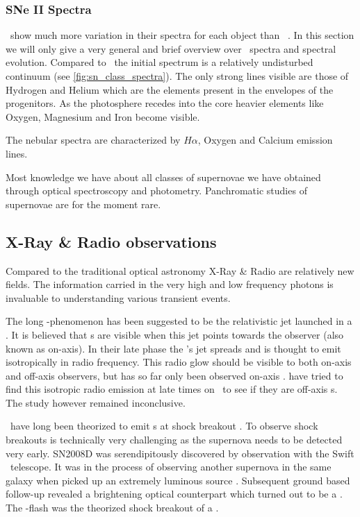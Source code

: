 \subsubsection{SNe II Spectra}
\sneii\ show much more variation in their spectra for each object than \sneia\ . In this section we will only give a very general and brief overview over \sneii\ spectra and spectral evolution. 
Compared to \sneia\ the initial spectrum is a relatively undisturbed continuum (see \ref{fig:sn_class_spectra}). The only strong lines visible are those of Hydrogen and Helium which are the elements present in the envelopes of the progenitors. 
As the photosphere recedes into the core heavier elements like Oxygen, Magnesium and Iron become visible. 

The nebular spectra are characterized by $H\alpha$, Oxygen and Calcium emission lines. 

Most knowledge we have about all classes of supernovae we have obtained through optical spectroscopy and photometry. Panchromatic studies of supernovae are for the moment rare.

\subsection{X-Ray \& Radio observations}

Compared to the traditional optical astronomy X-Ray \& Radio are relatively new fields. The information carried in the very high and low frequency photons is invaluable to understanding various transient events. 

The long \grb-phenomenon has been suggested to be the relativistic jet launched in a \snibc. It is believed that \grb s are visible when this jet points towards the observer (also known as on-axis). In their late phase the \grb 's jet spreads and is thought to emit isotropically in radio frequency. This radio glow should be visible to both on-axis and off-axis observers, but has so far only been observed on-axis . \cite{2006ApJ...638..930S} have tried to find this isotropic radio emission at late times on \snibc\ to see if they are off-axis \grb s. The study however remained inconclusive.

\sneii\ have long been theorized to emit \xray s at shock breakout \citep{1978ApJ...223L.109K,1974ApJ...187..333C}. To observe shock breakouts is technically very challenging as the supernova needs to be detected very early. SN2008D was serendipitously discovered by observation with the Swift \xray\ telescope. It was in the process of observing another supernova  in the same galaxy when  picked up an extremely luminous source \cite{2008Natur.453..469S}. Subsequent ground based follow-up revealed a brightening optical counterpart which turned out to be a \snibc. The \xray-flash was the theorized shock breakout of a \snii.

